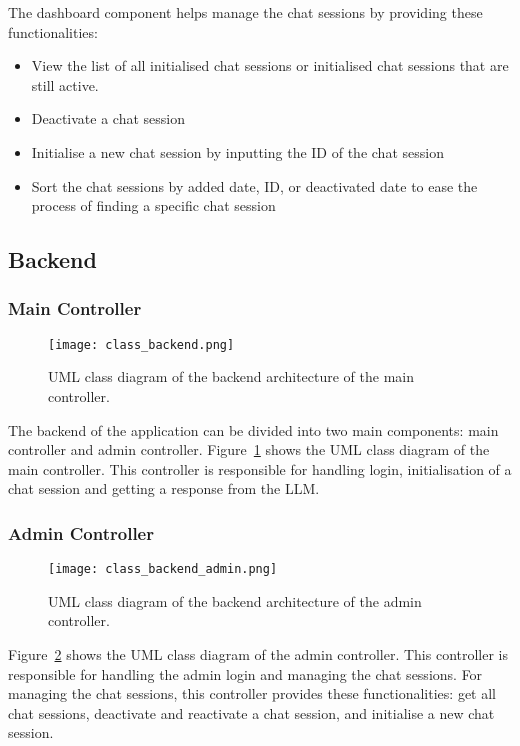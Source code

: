 The dashboard component helps manage the chat sessions by providing these functionalities:
\begin{itemize}
    \item View the list of all initialised chat sessions or initialised chat sessions that are still active.
    \item Deactivate a chat session
    \item Initialise a new chat session by inputting the ID of the chat session
    \item Sort the chat sessions by added date, ID, or deactivated date to ease the process of finding a specific chat session
\end{itemize}

\subsection{Backend}

\subsubsection{Main Controller}

\begin{figure}[h!]
    \centering
    \texttt{[image: class\_backend.png]}
    \caption{UML class diagram of the backend architecture of the main controller.}
    \label{class_backend}
\end{figure}

The backend of the application can be divided into two main components: main controller and admin controller.
Figure~\ref{class_backend} shows the UML class diagram of the main controller.
This controller is responsible for handling login, initialisation of a chat session and getting a response from the \ac{LLM}.

\subsubsection{Admin Controller}

\begin{figure}[h!]
    \centering
    \texttt{[image: class\_backend\_admin.png]}
    \caption{UML class diagram of the backend architecture of the admin controller.}
    \label{class_backend_admin}
\end{figure}

Figure~\ref{class_backend_admin} shows the UML class diagram of the admin controller.
This controller is responsible for handling the admin login and managing the chat sessions.
For managing the chat sessions, this controller provides these functionalities: get all chat sessions, deactivate and reactivate a chat session, and initialise a new chat session.

